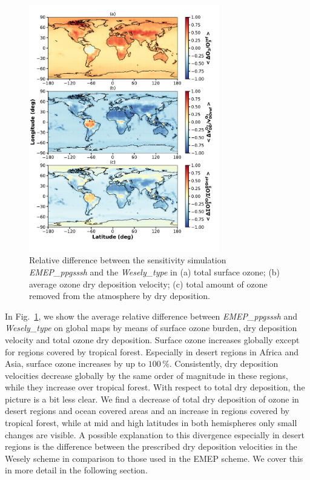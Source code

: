\documentclass[gmd, manuscript]{copernicus}
\begin{document}
\begin{figure}[t]
  \includegraphics[width=8.3cm]{fig04}
  \caption{Relative difference between the sensitivity simulation \emph{EMEP\_ppgsssh} and the \emph{Wesely\_type} in (a) total surface ozone; (b) average ozone dry deposition velocity; (c) total amount of ozone removed from the atmosphere by dry deposition.}
  \label{fig:diff_maps}
\end{figure}
%
In Fig.~\ref{fig:diff_maps}, we show the average relative difference between \emph{EMEP\_ppgsssh} and \emph{Wesely\_type} on global maps by means of surface ozone burden, dry deposition velocity and total ozone dry deposition. Surface ozone increases globally except for regions covered by tropical forest. Especially in desert regions in Africa and Asia, surface ozone increases by up to $100\,\unit{\%}$. Consistently, dry deposition velocities decrease globally by the same order of magnitude in these regions, while they increase over tropical forest. With respect to total dry deposition, the picture is a bit less clear. We find a decrease of total dry deposition of ozone in desert regions and ocean covered areas and an increase in regions covered by tropical forest, while at mid and high latitudes in both hemispheres only small changes are visible. A possible explanation to this divergence especially in desert regions is the difference between the prescribed dry deposition velocities in the Wesely scheme in comparison to those used in the EMEP scheme. We cover this in more detail in the following section.

\end{document}
